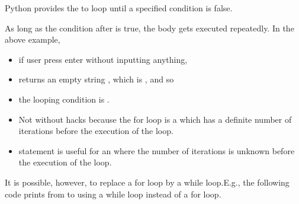 \documentclass[letterpaper,10pt,english]{sphinxmanual}
\begin{document}
Python provides the  to loop until a specified condition is false.

\begin{sphinxVerbatim}[commandchars=\\\{\}]
   
\end{sphinxVerbatim}

As long as the condition after  is true, the body gets executed repeatedly. In the above example,
\begin{itemize}
\item {} 
if user press enter without inputting anything,

\item {} 
 returns an empty string , which is , and so

\item {} 
the looping condition  is .

\end{itemize}

\begin{itemize}
\item {} 
Not without hacks because the for loop is a  which has a definite number of iterations before the execution of the loop.

\item {} 
 statement is useful for an  where the number of iterations is unknown before the execution of the loop.

\end{itemize}

It is possible, however, to replace a for loop by a while loop.E.g., the following code prints from  to  using a while loop instead of a for loop.

\begin{sphinxVerbatim}[commandchars=\\\{\}]
  
   
      
\end{sphinxVerbatim}
\end{document}
